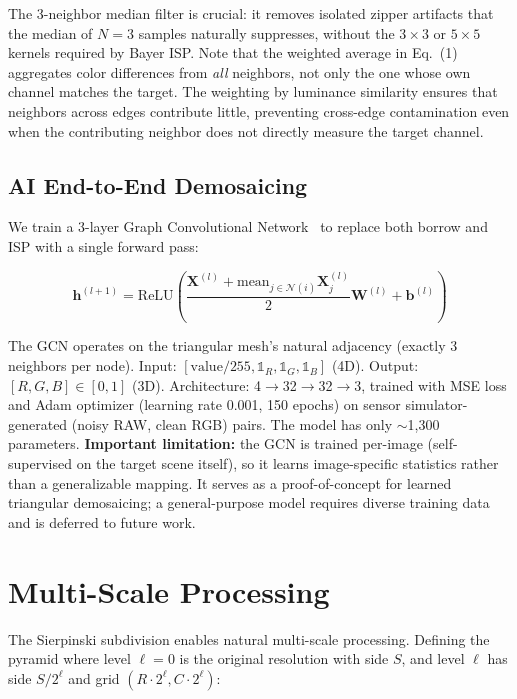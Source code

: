 \documentclass[10pt,twocolumn,letterpaper]{article}
\begin{document}
The 3-neighbor median filter is crucial: it removes isolated zipper artifacts that the median of $N=3$ samples naturally suppresses, without the $3\times3$ or $5\times5$ kernels required by Bayer ISP. Note that the weighted average in Eq.~(1) aggregates color differences from \emph{all} neighbors, not only the one whose own channel matches the target. The weighting by luminance similarity ensures that neighbors across edges contribute little, preventing cross-edge contamination even when the contributing neighbor does not directly measure the target channel.

\subsection{AI End-to-End Demosaicing}

We train a 3-layer Graph Convolutional Network~\cite{kipf2017} to replace both borrow and ISP with a single forward pass:

\begin{equation}
\mathbf{h}^{(l+1)} = \text{ReLU}\!\left(\!\frac{\mathbf{X}^{(l)} + \text{mean}_{j\in\mathcal{N}(i)}\mathbf{X}^{(l)}_j}{2} \mathbf{W}^{(l)} + \mathbf{b}^{(l)}\!\right)
\end{equation}

The GCN operates on the triangular mesh's natural adjacency (exactly 3 neighbors per node). Input: $[\text{value}/255, \mathbb{1}_R, \mathbb{1}_G, \mathbb{1}_B]$ (4D). Output: $[R, G, B] \in [0,1]$ (3D). Architecture: 4$\to$32$\to$32$\to$3, trained with MSE loss and Adam optimizer (learning rate 0.001, 150 epochs) on sensor simulator-generated (noisy RAW, clean RGB) pairs. The model has only $\sim$1,300 parameters. \textbf{Important limitation:} the GCN is trained per-image (self-supervised on the target scene itself), so it learns image-specific statistics rather than a generalizable mapping. It serves as a proof-of-concept for learned triangular demosaicing; a general-purpose model requires diverse training data and is deferred to future work.

\section{Multi-Scale Processing}
\label{sec:multiscale}

The Sierpinski subdivision enables natural multi-scale processing. Defining the pyramid where level $\ell=0$ is the original resolution with side $S$, and level $\ell$ has side $S / 2^\ell$ and grid $(R \cdot 2^\ell, C \cdot 2^\ell)$:
\end{document}
